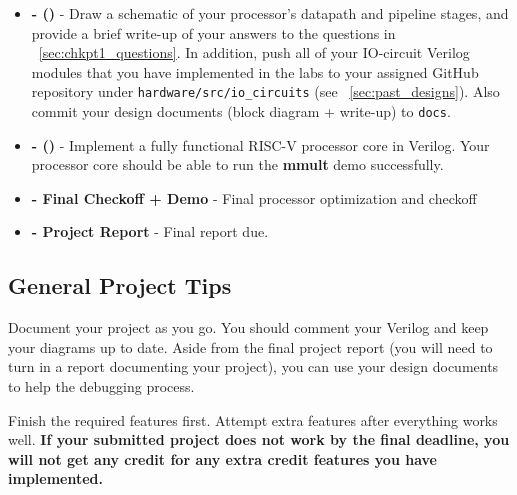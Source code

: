\documentclass[11pt]{article}
\begin{document}
\begin{minipage}{\textwidth}
\vspace{2mm}
\begin{itemize}

  \item \textbf{\blockDiagramDueDate \space - \blockDiagramTaskName \space (\blockDiagramTimeAlloted)} - Draw a schematic of your processor's datapath and pipeline stages, and provide a brief write-up of your answers to the questions in ~\ref{sec:chkpt1_questions}. In addition, push all of your IO-circuit Verilog modules that you have implemented in the labs to your assigned GitHub repository under \verb|hardware/src/io_circuits| (see ~\ref{sec:past_designs}). Also commit your design documents (block diagram + write-up) to \verb|docs|.
  \item \textbf{\baseCPUDueDate \space - \baseCPUTaskName \space (\baseCPUTimeAlloted)} - Implement a fully functional RISC-V processor core in Verilog. Your processor core should be able to run the \textbf{mmult} demo successfully.
  
  
  \item \textbf{\finalCheckoffDueDate \space - Final Checkoff + Demo} - Final processor optimization and checkoff
  \item \textbf{\finalReportDueDate \space - Project Report} - Final report due.
  
\end{itemize}
\vspace{2mm}
\end{minipage}


\subsection{General Project Tips}
\label{tips}
Document your project as you go.
You should comment your Verilog and keep your diagrams up to date.
Aside from the final project report (you will need to turn in a report documenting your project), you can use your design documents to help the debugging process.

Finish the required features first.
Attempt extra features after everything works well.
\textbf{If your submitted project does not work by the final deadline, you will not get any credit for any extra credit features you have implemented.}
\end{document}
